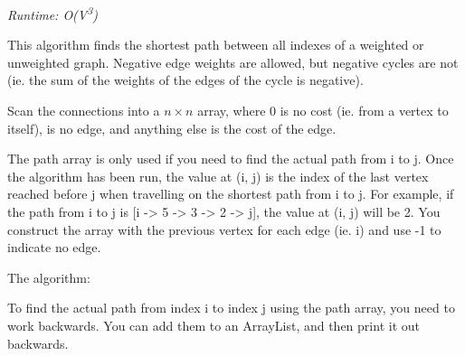 
\textit{Runtime: O(V\textsuperscript{3})}

This algorithm finds the shortest path between all indexes of a weighted or unweighted graph. Negative edge weights are allowed, but negative cycles are not (ie. the sum of the weights of the edges of the cycle is negative).

Scan the connections into a $n \times n$  array, where 0 is no cost (ie. from a vertex to itself),  is no edge, and anything else is the cost of the edge.

The path array is only used if you need to find the actual path from i to j. Once the algorithm has been run, the value at (i, j) is the index of the last vertex reached before j when travelling on the shortest path from i to j. For example, if the path from i to j is [i -> 5 -> 3 -> 2 -> j], the value at (i, j) will be 2. You construct the array with the previous vertex for each edge (ie. i) and use -1 to indicate no edge.



The algorithm:



To find the actual path from index i to index j using the path array, you need to work backwards. You can add them to an ArrayList, and then print it out backwards.



\newpage